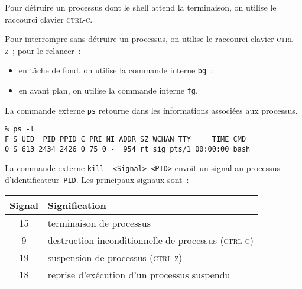 \begin{frame}[fragile]
  Pour d\'etruire un processus dont le shell attend la terminaison, on
  utilise le raccourci clavier \textsc{ctrl-c}.
  \par
  Pour interrompre sans d\'etruire un processus, on utilise le
  raccourci clavier \textsc{ctrl-z}~; pour le relancer~:
  \begin{itemize}
  \item en t\^ache de fond, on utilise la commande interne \verb?bg?~;
  \item en avant plan, on utilise la commande interne \verb?fg?.
  \end{itemize}
  \par\smallskip
  La commande externe \verb?ps? retourne dans \stdout{} les
  informations associ\'ees aux processus.
\begin{verbatim}
% ps -l
F S UID  PID PPID C PRI NI ADDR SZ WCHAN TTY     TIME CMD
0 S 613 2434 2426 0 75 0 -  954 rt_sig pts/1 00:00:00 bash
\end{verbatim}
  La commande externe \verb?kill -<Signal> <PID>? envoit un signal au
  processus d'identificateur~\verb?PID?. Les principaux signaux sont~:
  \par
  \begin{tabular}{c|l}
    Signal & Signification \\\hline{}
    15     & terminaison de processus \\
    9      & destruction inconditionnelle de processus (\textsc{ctrl-c})\\
    19     & suspension de processus (\textsc{ctrl-z})\\
    18     & reprise d'ex\'ecution d'un processus suspendu
  \end{tabular}
\end{frame}
